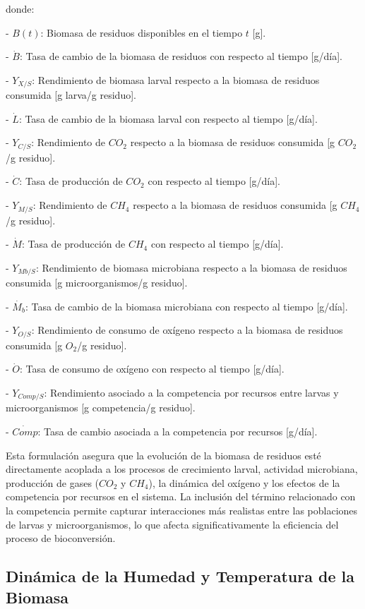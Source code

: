 donde:

- $B(t)$: Biomasa de residuos disponibles en el tiempo $t$ [g].

- $\dot{B}$: Tasa de cambio de la biomasa de residuos con respecto al tiempo [g/día].

- $Y_{X/S}$: Rendimiento de biomasa larval respecto a la biomasa de residuos consumida [g larva/g residuo].

- $\dot{L}$: Tasa de cambio de la biomasa larval con respecto al tiempo [g/día].

- $Y_{C/S}$: Rendimiento de $CO_2$ respecto a la biomasa de residuos consumida [g $CO_2$/g residuo].

- $\dot{C}$: Tasa de producción de $CO_2$ con respecto al tiempo [g/día].

- $Y_{M/S}$: Rendimiento de $CH_4$ respecto a la biomasa de residuos consumida [g $CH_4$/g residuo].

- $\dot{M}$: Tasa de producción de $CH_4$ con respecto al tiempo [g/día].

- $Y_{Mb/S}$: Rendimiento de biomasa microbiana respecto a la biomasa de residuos consumida [g microorganismos/g residuo].

- $\dot{M_b}$: Tasa de cambio de la biomasa microbiana con respecto al tiempo [g/día].

- $Y_{O/S}$: Rendimiento de consumo de oxígeno respecto a la biomasa de residuos consumida [g $O_2$/g residuo].

- $\dot{O}$: Tasa de consumo de oxígeno con respecto al tiempo [g/día].

- $Y_{Comp/S}$: Rendimiento asociado a la competencia por recursos entre larvas y microorganismos [g competencia/g residuo].

- $\dot{Comp}$: Tasa de cambio asociada a la competencia por recursos [g/día].

\vspace{1cm}

Esta formulación asegura que la evolución de la biomasa de residuos esté directamente acoplada a los procesos de crecimiento larval, actividad microbiana, producción de gases ($CO_2$ y $CH_4$), la dinámica del oxígeno y los efectos de la competencia por recursos en el sistema. La inclusión del término relacionado con la competencia permite capturar interacciones más realistas entre las poblaciones de larvas y microorganismos, lo que afecta significativamente la eficiencia del proceso de bioconversión.

\subsection{Dinámica de la Humedad y Temperatura de la Biomasa}

